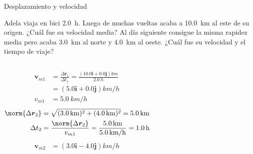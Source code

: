 \documentclass[9pt, aspectratio=169]{beamer}
\begin{document}
\begin{frame}{Desplazamiento y velocidad}
\begin{example}
    Adela viaja en bici \qty{2.0}{h}. Luego de muchas vueltas acaba a \qty{10.0}{km} al este de su origen. ¿Cuál fue su velocidad media? Al día siguiente consigue la misma rapidez media pero acaba \qty{3.0}{km} al norte y \qty{4.0}{km} al oeste. ¿Cuál fue su velocidad y el tiempo de viaje?   
    {\small
    \begin{columns}
        \begin{align*}
            \bm{v}_{m1} &= \frac{\Delta \bm{r}_1}{\Delta t_1} = \frac{(\num{10.0} \bm{i} + \num{0.0} \bm{j}) \unit{km}}{\qty{2.0}{h}} \\
                   &= (\num{5.0} \bm{i} + \num{0.0} \bm{j}) \unit{km/h} \\
            v_{m1} &= \qty{5.0}{km/h} 
        \end{align*}
        \begin{align*}
            \norm{\Delta \bm{r}_2} &= \sqrt{(\qty{3.0}{km})^2 + (\qty{4.0}{km})^2} = \qty{5.0}{km} \\
            \Delta t_2 &= \frac{\norm{\Delta \bm{r}_2}}{v_{m1}} = \frac{\qty{5.0}{km}}{\qty{5.0}{km/h}} = \qty{1.0}{h}
        \end{align*}
        \begin{align*}
            \bm{v}_{m2} &= (\num{3.0} \bm{i} - \num{4.0} \bm{j}) \unit{km/h}
        \end{align*}
    \end{columns}
    }
\end{example}
\end{frame}
\end{document}
